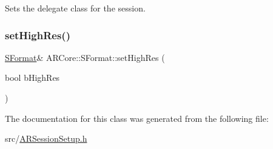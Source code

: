 Sets the delegate class for the session. 

\mbox{\label{class_a_r_core_1_1_s_format_ab8ae6c580251e595bcd1304b4c858ab1}} 
\subsubsection{\texorpdfstring{set\+High\+Res()}{setHighRes()}}
{\footnotesize\ttfamily \mbox{\hyperlink{class_a_r_core_1_1_s_format}{S\+Format}}\& A\+R\+Core\+::\+S\+Format\+::set\+High\+Res (\begin{DoxyParamCaption}\item[{bool}]{b\+High\+Res }\end{DoxyParamCaption})\hspace{0.3cm}{\ttfamily [inline]}}



The documentation for this class was generated from the following file\+:\begin{DoxyCompactItemize}
\item 
src/\mbox{\hyperlink{_a_r_session_setup_8h}{A\+R\+Session\+Setup.\+h}}\end{DoxyCompactItemize}
